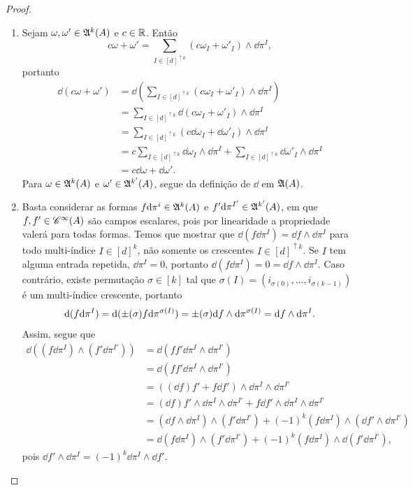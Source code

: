 \begin{proof}
	\begin{enumerate}
	\item Sejam $\omega,\omega' \in \mathfrak{A}^k (A)$ e $c \in \mathbb{R}$. Então
	\begin{equation*}
	c\omega + \omega' = \sum_{I \in [d]^{\uparrow k}} (c\omega_I + \omega'_I) \wedge \dd\pi^I,
	\end{equation*}
portanto
		\begin{align*}
		\dd (c\omega + \omega') &= \dd \left( \sum_{I \in [d]^{\uparrow k}} (c\omega_I + \omega'_I) \wedge \dd\pi^I \right) \\
			&= \sum_{I \in [d]^{\uparrow k}} \dd(c\omega_I + \omega'_I) \wedge \dd\pi^I \\
			&= \sum_{I \in [d]^{\uparrow k}} (c\dd\omega_I + \dd\omega'_I) \wedge \dd\pi^I \\
			&= c\sum_{I \in [d]^{\uparrow k}} \dd\omega_I \wedge \dd\pi^I + \sum_{I \in [d]^{\uparrow k}} \dd\omega'_I \wedge \dd\pi^I \\
			&= c\dd\omega + \dd\omega'.
		\end{align*}
Para $\omega \in \mathfrak{A}^k (A)$ e $\omega' \in \mathfrak{A}^{k'} (A)$, segue da definição de $\dd$ em $\mathfrak{A} (A)$.

	\item Basta considerar as formas $f \mathrm{d}\pi^i \in \mathfrak{A}^k (A)$ e $f' \mathrm{d}\pi^{I'} \in \mathfrak{A}^{k'} (A)$, em que $f,f' \in \mathscr{C}^\infty(A)$ são campos escalares, pois por linearidade a propriedade valerá para todas formas. Temos que mostrar que $\dd(f \dd\pi^I)=\dd f \wedge \dd\pi^I$ para todo multi-índice $I \in [d]^k$, não somente os crescentes $I \in [d]^{\uparrow k}$. Se $I$ tem alguma entrada repetida, $\dd\pi^I = 0$, portanto $\dd(f \dd\pi^I) = 0 = \dd f \wedge \dd\pi^I$. Caso contrário, existe permutação $\sigma \in [k]$ tal que $\sigma(I) = (i_{\sigma(0)},\ldots,i_{\sigma(k-1)})$ é um multi-índice crescente, portanto
		\begin{equation*}
		\mathrm{d}(f \mathrm{d}\pi^I) = \mathrm{d}(\mathord{\pm}(\sigma)f \mathrm{d}\pi^{\sigma(I)}) = \mathord{\pm}(\sigma) \mathrm{d} f \wedge \mathrm{d}\pi^{\sigma(I)} = \mathrm{d} f \wedge \mathrm{d}\pi^I.
		\end{equation*}
Assim, segue que
	\begin{align*}
	\dd((f \dd\pi^I) \wedge (f' \dd\pi^{I'})) &= \dd(ff' \dd\pi^I \wedge \dd\pi^{I'}) \\
		&= \dd(ff' \dd\pi^I \wedge \dd\pi^{I'}) \\
		&= ((\dd f) f' + f \dd f') \wedge \dd\pi^I \wedge \dd\pi^{I'} \\
		&= (\dd f)f' \wedge \dd\pi^I \wedge \dd\pi^{I'} + f \dd f' \wedge \dd\pi^I \wedge \dd\pi^{I'} \\
		&= (\dd f \wedge \dd\pi^I) \wedge (f' \dd\pi^{I'}) + (-1)^k (f \dd\pi^I) \wedge (\dd f' \wedge \dd\pi^{I'}) \\
		&= \dd (f \dd\pi^I) \wedge (f' \dd\pi^{I'}) + (-1)^k (f \dd\pi^I) \wedge \dd (f' \dd\pi^{I'}),
	\end{align*}
pois $\dd f' \wedge \dd\pi^I = (-1)^k \dd\pi^I \wedge \dd f'$.


\end{enumerate}
\end{proof}
